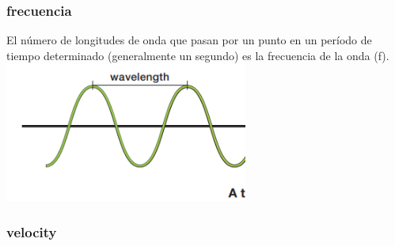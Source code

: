 \documentclass{beamer}
\begin{document}
\begin{frame}
    \frametitle{frecuencia}
    \pause  El número de longitudes de onda que pasan por un punto en un período de tiempo determinado (generalmente un segundo) es la frecuencia de la onda (f).
    \vspace{1cm}
    \includegraphics[width=8cm]{../../../../public/wavelength.png}
\end{frame}




\subsubsection{velocity}
\end{document}
